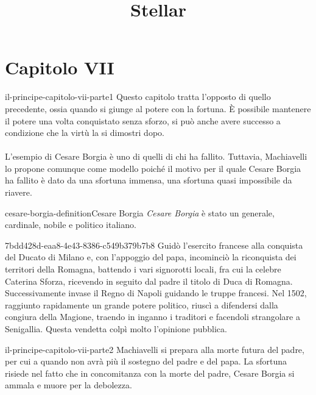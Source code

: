\documentclass[preview]{standalone}
\begin{document}
\title{Stellar}
\genpage

\section{Capitolo VII}

\begin{snippet}{il-principe-capitolo-vii-parte1}
    Questo capitolo tratta l'opposto di quello precedente, ossia quando si giunge al potere
    con la fortuna.
    È possibile mantenere il potere una volta conquistato senza sforzo, si può
    anche avere successo a condizione che la virtù la si dimostri dopo.
    \\\\
    L'esempio di Cesare Borgia è uno di quelli di chi ha fallito.
    Tuttavia, Machiavelli lo propone comunque come modello poiché
    il motivo per il quale Cesare Borgia ha fallito è dato da una sfortuna immensa,
    una sfortuna quasi impossibile da riavere.
\end{snippet}

\begin{snippetdefinition}{cesare-borgia-definition}{Cesare Borgia}
    \textit{Cesare Borgia} è stato un generale, cardinale, nobile e politico italiano.
\end{snippetdefinition}

\begin{snippetnote}{7bdd428d-eaa8-4e43-8386-c549b379b7b8}{}%
    Guidò l'esercito francese alla conquista del Ducato di Milano e,
    con l'appoggio del papa, incominciò la riconquista dei territori della Romagna,
    battendo i vari signorotti locali, fra cui la celebre Caterina Sforza,
    ricevendo in seguito dal padre il titolo di Duca di Romagna.
    Successivamente invase il Regno di Napoli guidando le truppe francesi.
    Nel 1502, raggiunto rapidamente un grande potere politico,
    riuscì a difendersi dalla congiura della Magione,
    traendo in inganno i traditori e facendoli strangolare a Senigallia.
    Questa vendetta colpì molto l'opinione pubblica.
\end{snippetnote}

\begin{snippet}{il-principe-capitolo-vii-parte2}
    Machiavelli si prepara alla morte futura del padre, per cui a quando
    non avrà più il sostegno del padre e del papa.
    La sfortuna risiede nel fatto che in concomitanza con la morte del padre,
    Cesare Borgia si ammala e muore per la debolezza.
\end{snippet}
\end{document}
